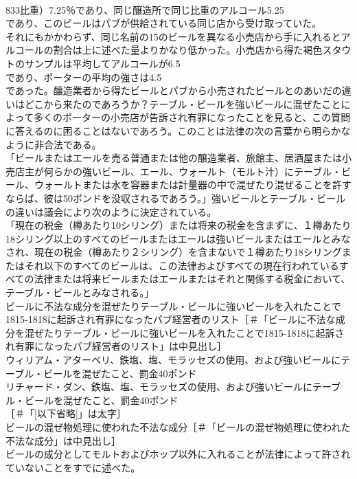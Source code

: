 \documentclass[8pt]{extreport}
\begin{document}
\begin{CJK}{UTF8}{min}
\\	833比重）7.25％であり、同じ醸造所で同じ比重のアルコール5.25
\\	であり、このビールはパブが供給されている同じ店から受け取っていた。
\\	それにもかかわらず、同じ名前の15のビールを異なる小売店から手に入れるとアルコールの割合は上に述べた量よりかなり低かった。小売店から得た褐色スタウトのサンプルは平均してアルコールが6.5
\\	であり、ポーターの平均の強さは4.5
\\	であった。醸造業者から得たビールとパブから小売されたビールとのあいだの違いはどこから来たのであろうか？テーブル・ビールを強いビールに混ぜたことによって多くのポーターの小売店が告訴され有罪になったことを見ると、この質問に答えるのに困ることはないであろう。このことは法律の次の言葉から明らかなように非合法である。
\\	「ビールまたはエールを売る普通または他の醸造業者、旅館主、居酒屋または小売店主が何らかの強いビール、エール、ウォールト（モルト汁）にテーブル・ビール、ウォールトまたは水を容器または計量器の中で混ぜたり混ぜることを許すならば、彼は50ポンドを没収されるであろう。」強いビールとテーブル・ビールの違いは議会により次のように決定されている。
\\	「現在の税金（樽あたり10シリング）または将来の税金を含まずに、１樽あたり18シリング以上のすべてのビールまたはエールは強いビールまたはエールとみなされ、現在の税金（樽あたり２シリング）を含まないで１樽あたり18シリングまたはそれ以下のすべてのビールは、この法律およびすべての現在行われているすべての法律または将来ビールまたはエールまたはそれと関係する税金において、テーブル・ビールとみなされる。」
\\	ビールに不法な成分を混ぜたりテーブル・ビールに強いビールを入れたことで1815-1818に起訴され有罪になったパブ経営者のリスト［＃「ビールに不法な成分を混ぜたりテーブル・ビールに強いビールを入れたことで1815-1818に起訴され有罪になったパブ経営者のリスト」は中見出し］
\\	ウィリアム・アターベリ、鉄塩、塩、モラッセズの使用、および強いビールにテーブル・ビールを混ぜたこと、罰金40ポンド
\\	リチャード・ダン、鉄塩、塩、モラッセズの使用、および強いビールにテーブル・ビールを混ぜたこと、罰金40ポンド
\\	[以下省略]［＃「[以下省略]」は太字］
\\	ビールの混ぜ物処理に使われた不法な成分［＃「ビールの混ぜ物処理に使われた不法な成分」は中見出し］
\\	ビールの成分としてモルトおよびホップ以外に入れることが法律によって許されていないことをすでに述べた。

\end{CJK}
\end{document}
